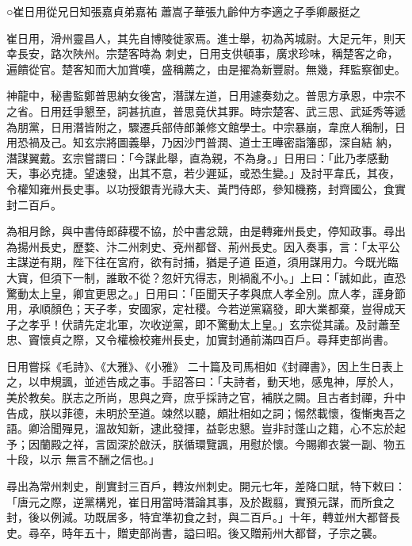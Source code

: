 
\begin{pinyinscope}

 ○崔日用從兄日知張嘉貞弟嘉祐
 蕭嵩子華張九齡仲方李適之子季卿嚴挺之



 崔日用，滑州靈昌人，其先自博陵徙家焉。進士舉，初為芮城尉。大足元年，則天幸長安，路次陜州。宗楚客時為
 刺史，日用支供頓事，廣求珍味，稱楚客之命，遍饋從官。楚客知而大加賞嘆，盛稱薦之，由是擢為新豐尉。無幾，拜監察御史。



 神龍中，秘書監鄭普思納女後宮，潛謀左道，日用遽奏劾之。普思方承恩，中宗不之省。日用廷爭懇至，詞甚抗直，普思竟伏其罪。時宗楚客、武三思、武延秀等遞為朋黨，日用潛皆附之，驟遷兵部侍郎兼修文館學士。中宗暴崩，韋庶人稱制，日用恐禍及己。知玄宗將圖義舉，乃因沙門普潤、道士王曄密詣籓邸，深自結
 納，潛謀翼戴。玄宗嘗謂曰：「今謀此舉，直為親，不為身。」日用曰：「此乃孝感動天，事必克捷。望速發，出其不意，若少遲延，或恐生變。」及討平韋氏，其夜，令權知雍州長史事。以功授銀青光祿大夫、黃門侍郎，參知機務，封齊國公，食實封二百戶。



 為相月餘，與中書侍郎薛稷不協，於中書忿競，由是轉雍州長史，停知政事。尋出為揚州長史，歷婺、汴二州刺史、兗州都督、荊州長史。因入奏事，言：「太平公主謀逆有期，陛下往在宮府，欲有討捕，猶是子道
 臣道，須用謀用力。今既光臨大寶，但須下一制，誰敢不從？忽奸宄得志，則禍亂不小。」上曰：「誠如此，直恐驚動太上皇，卿宜更思之。」日用曰：「臣聞天子孝與庶人孝全別。庶人孝，謹身節用，承順顏色；天子孝，安國家，定社稷。今若逆黨竊發，即大業都棄，豈得成天子之孝乎！伏請先定北軍，次收逆黨，即不驚動太上皇。」玄宗從其議。及討蕭至忠、竇懷貞之際，又令權檢校雍州長史，加實封通前滿四百戶。尋拜吏部尚書。



 日用嘗採《毛詩》、《大雅》、《小雅》
 二十篇及司馬相如《封禪書》，因上生日表上之，以申規諷，並述告成之事。手詔答曰：「夫詩者，動天地，感鬼神，厚於人，美於教矣。朕志之所尚，思與之齊，庶乎採詩之官，補朕之闕。且古者封禪，升中告成，朕以菲德，未明於至道。竦然以聽，頗壯相如之詞；惕然載懷，復慚夷吾之語。卿洽聞殫見，溫故知新，逮此發揮，益彰忠懇。豈非討蓬山之籍，心不忘於起予；因蘭殿之祥，言固深於啟沃，朕循環覽諷，用慰於懷。今賜卿衣裳一副、物五十段，以示
 無言不酬之信也。」



 尋出為常州刺史，削實封三百戶，轉汝州刺史。開元七年，差降口賦，特下敕曰：「唐元之際，逆黨構兇，崔日用當時潛論其事，及於戡翦，實預元謀，而所食之封，後以例減。功既居多，特宜準初食之封，與二百戶。」十年，轉並州大都督長史。尋卒，時年五十，贈吏部尚書，謚曰昭。後又贈荊州大都督，子宗之襲。




\end{pinyinscope}
